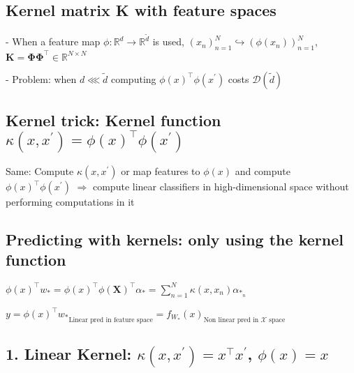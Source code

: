 


\subsection*{Kernel matrix K with feature spaces}
- When a feature map $\phi: \mathbb{R}^{d} \rightarrow \mathbb{R}^{\tilde{d}}$ is used,
$
\left(x_{n}\right)_{n=1}^{N} \hookrightarrow\left(\phi\left(x_{n}\right)\right)_{n=1}^{N}
$,
$
\mathbf{K}=\boldsymbol{\Phi} \boldsymbol{\Phi}^{\top} \in \mathbb{R}^{N \times N}
$

- Problem: when $d \lll \tilde{d}$ computing $\phi(x)^{\top} \phi\left(x^{\prime}\right)$ costs $\mathcal{D}(\tilde{d})$

\subsection*{Kernel trick: Kernel function $\kappa(x,x^{\prime})=\phi(x)^\top\phi(x^{\prime})$}

Same: Compute $\kappa\left(x, x^{\prime}\right)$ or map features to $\phi(x)$ and compute $\phi(x)^{\top} \phi\left(x^{\prime}\right)$ $\Rightarrow$ compute linear classifiers in high-dimensional space without performing computations in it

\subsection*{Predicting with kernels: only using the kernel function}


$\phi(x)^{\top} w_{*}=\phi(x)^{\top} \phi(\mathbf{X})^{\top} \alpha_{*}=\sum_{n=1}^{N} \kappa\left(x, x_{n}\right) \alpha_{*_{n}}$ 

$y={\phi(x)^\top w_*}_{\text{Linear pred in feature space}}={f_{W_*}(x)}_{\text{Non linear pred in $\mathcal{X}$ space}}$

\subsection*{1. Linear Kernel: $\kappa\left(x, x^{\prime}\right)=x^{\top} x^{\prime}$, $\phi(x)=x$}

